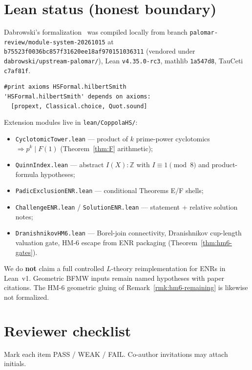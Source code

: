 \documentclass[11pt]{article}
\theoremstyle{definition}
\begin{document}
\appendix
\section{Lean status (honest boundary)}
\label{app:lean}

Dabrowski's formalization~\cite{dabrowski2026} was compiled locally from branch
\texttt{palomar-review/module-system-20261015} at
\texttt{b75523f0036bc857f31620ee18af970151036311}
(vendored under \texttt{dabrowski/upstream-palomar/}), Lean
\texttt{v4.35.0-rc3}, mathlib \texttt{1a547d8}, TauCeti \texttt{c7af81f}.

\begin{verbatim}
#print axioms HSFormal.hilbertSmith
'HSFormal.hilbertSmith' depends on axioms:
  [propext, Classical.choice, Quot.sound]
\end{verbatim}

Extension modules live in \texttt{lean/CoppolaHS/}:
\begin{itemize}
\item \texttt{CyclotomicTower.lean} --- product of $k$ prime-power cyclotomics
$\Rightarrow p^k\mid F(1)$ (Theorem~\ref{thm:F} arithmetic);
\item \texttt{QuinnIndex.lean} --- abstract $I(X):\mathbb{Z}$ with
$I\equiv 1\pmod{8}$ and product-formula hypotheses;
\item \texttt{PadicExclusionENR.lean} --- conditional Theorems E/F shells;
\item \texttt{ChallengeENR.lean} / \texttt{SolutionENR.lean} --- statement +
relative solution notes;
\item \texttt{DranishnikovHM6.lean} --- Borel-join connectivity, Dranishnikov
cup-length valuation gate, HM-6 escape from ENR packaging
(Theorem~\ref{thm:hm6-gates}).
\end{itemize}
We do \textbf{not} claim a full controlled $L$-theory reimplementation for ENRs
in Lean~v1.  Geometric BFMW inputs remain named hypotheses with paper citations.
The HM-6 geometric gluing of Remark~\ref{rmk:hm6-remaining} is likewise not
formalized.

\section{Reviewer checklist}
\label{app:checklist}

Mark each item PASS / WEAK / FAIL.  Co-author invitations may attach initials.
\end{document}
